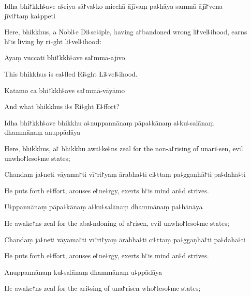 Idha bhi꜓kkh꜕ave a꜕riya-sā꜓va꜕ko micchā-ājīvaṃ pa꜕hāya sammā-ājī꜓vena jīvi꜓taṃ ka꜕ppeti

\begin{english}
  Here, bhikkhus, a Nobl꜕e Di꜕sc꜕iple, having a꜓bandoned wrong li꜓vel꜕ihood, earns h꜓is living by ri꜕ght li꜕vel꜕ihood:
\end{english}

Ayaṃ vuccati bhi꜓kkh꜕ave sa꜓mmā-ājīvo

\begin{english}
  This bhikkhus is ca꜕lled Ri꜕ght Li꜕vel꜕ihood.
\end{english}

Katamo ca bhi꜓kkh꜕ave sa꜓mmā-vāyāmo

\begin{english}
  And what bhikkhus i꜕s Ri꜕ght E꜕ffort?
\end{english}

Idha bhi꜓kkh꜕ave bhikkhu a꜕nuppannānaṃ pāpa꜕kānaṃ a꜕ku꜕salānaṃ dhammānaṃ anuppādāya

\begin{english}
  Here, bhikkhus, a꜓ bhikkhu awa꜕ke꜕ns zeal for the non-a꜓rising of unari꜕sen, evil unwho꜓leso꜕me states;
\end{english}

Chandaṃ ja꜕neti vāyama꜓ti vī꜓ri꜓yaṃ ārabha꜕ti ci꜕ttaṃ pa꜕ggaṇhā꜓ti pa꜕daha꜕ti

\begin{english}
  He puts forth e꜕ffort, arouses e꜓ne꜕rgy, exerts h꜓is mind an꜕d strives.
\end{english}

U꜕ppannānaṃ pāpa꜕kānaṃ a꜕ku꜕salānaṃ dhammānaṃ pa꜕hānāya

\begin{english}
  He awake꜓ns zeal for the aba꜕ndoning of a꜓risen, evil unwho꜓leso꜕me states;
\end{english}

Chandaṃ ja꜕neti vāyama꜓ti vī꜓ri꜓yaṃ ārabha꜕ti ci꜕ttaṃ pa꜕ggaṇhā꜓ti pa꜕daha꜕ti

\begin{english}
  He puts forth e꜕ffort, arouses e꜓ne꜕rgy, exerts h꜓is mind an꜕d strives.
\end{english}

Anuppannānaṃ ku꜕salānaṃ dhammānaṃ u꜕ppādāya

\begin{english}
  He awake꜓ns zeal for the ari꜕sing of una꜓risen who꜓leso꜕me states;
\end{english}

